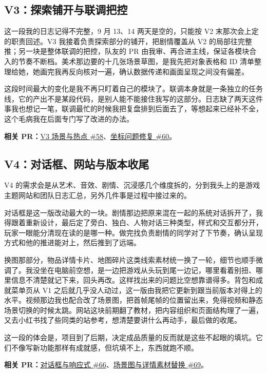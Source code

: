 \subsection{V3：探索铺开与联调把控}

这一段我的日志记得不完整，9 月 13、14 两天是空的，只能按 V2 末那次会上定的职责回述。V3 我接着负责探索部分的铺开，把剧情覆盖从 V2 的局部往完整推；另一块是整体联调的把控，队友的 PR 由我审、再合进主线，保证各模块合入的节奏不断档。美术那边要的十几张场景草图，是我先把对象表格和 ID 清单整理给她，她画完我再反向核对一遍，确认数据传递和画面呈现之间没有偏差。

这段时间最大的变化是我不再只盯着自己的模块了。联调本身就是一条独立的任务线，它的产出不是某段代码，是别人能不能接住我写的这部分。日志缺了两天这件事我也想记一笔，联调最忙的时候我把复盘排到后面去了，等想起来已经补不全，这个毛病我在后面专门写了改进的办法。

\textbf{相关 PR：}\href{https://github.com/214notfound/jiedeng/pull/58}{V3 场景与热点 \#58}、\href{https://github.com/214notfound/jiedeng/pull/60}{坐标问题修复 \#60}。

\subsection{V4：对话框、网站与版本收尾}

V4 的需求会是从艺术、音效、剧情、沉浸感几个维度拆的，分到我头上的是游戏主题网站和团队日志汇总，另外几件事是过程中接过来的。

对话框是这一版改动最大的一块。剧情那边把原来混在一起的系统对话拆开了，我得跟着重新设计，最后定了旁白、独白、人物对话三种类型，样式和交互都分开，玩家一眼能分清现在读的是哪一种。做完找负责剧情的同学对了下节奏，确认呈现方式和他的推进能对上，然后推到了远端。

换图那部分，物品详情卡片、地图碎片这类线索素材统一换了一轮，细节也顺手微调了。我没坐在电脑前空想，是一边把游戏从头玩到尾一边记，哪里看着别扭、哪里信息不清楚就记下来，回头再改。这样找出来的问题比空想靠谱得多。背包和成就菜单页从 V1 之后就几乎没人动过，这一版由我把它更新到跟当前版本对得上的水平。视频那边我也配合改了场景图，把首帧尾帧的位置留出来，免得视频和静态场景切换的时候太跳。网站这块前期翻了教材，把内容组织和页面结构理了一遍，又去小红书找了些同类的站参考，想清楚要讲什么再动手，最后做的收尾。

这一段的体会是，项目到了后期，决定成品质量的反而就是这些不起眼的填坑。它们不像写新功能那样有成就感，但坑填不上，东西就跑不顺。

\textbf{相关 PR：}\href{https://github.com/214notfound/jiedeng/pull/66}{对话框与响应式 \#66}、\href{https://github.com/214notfound/jiedeng/pull/69}{场景图与详情素材替换 \#69}。


